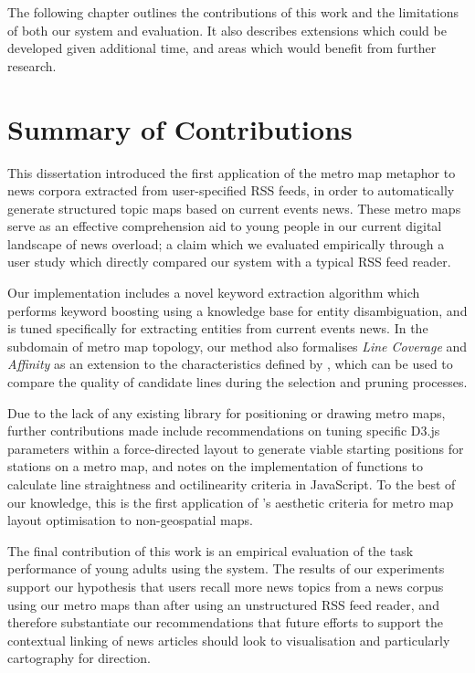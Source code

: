 The following chapter outlines the contributions of this work and the limitations of both our system and evaluation. It also describes extensions which could be developed given additional time, and areas which would benefit from further research.

\section{Summary of Contributions}

This dissertation introduced the first application of the metro map metaphor \citep{GeneratingInformationMaps} to news corpora extracted from user-specified RSS feeds, in order to automatically generate structured topic maps based on current events news. These metro maps serve as an effective comprehension aid to young people in our current digital landscape of news overload; a claim which we evaluated empirically through a user study which directly compared our system with a typical RSS feed reader.

Our implementation includes a novel keyword extraction algorithm which performs keyword boosting using a knowledge base for entity disambiguation, and is tuned specifically for extracting entities from current events news. In the subdomain of metro map topology, our method also formalises \textit{Line Coverage} and \textit{Affinity} as an extension to the characteristics defined by \cite{GeneratingInformationMaps}, which can be used to compare the quality of candidate lines during the selection and pruning processes.

Due to the lack of any existing library for positioning or drawing metro maps, further contributions made include recommendations on tuning specific D3.js parameters within a force-directed layout to generate viable starting positions for stations on a metro map, and notes on the implementation of functions to calculate  line straightness and octilinearity criteria in JavaScript. To the best of our knowledge, this is the first application of \citeauthor{AutomaticMetroMapLayoutThesis}'s aesthetic criteria for metro map layout optimisation to non-geospatial maps.

The final contribution of this work is an empirical evaluation of the task performance of young adults using the system. The results of our experiments support our hypothesis that users recall more news topics from a news corpus using our metro maps than after using an unstructured RSS feed reader, and therefore substantiate our recommendations that future efforts to support the contextual linking of news articles should look to visualisation and particularly cartography for direction.

